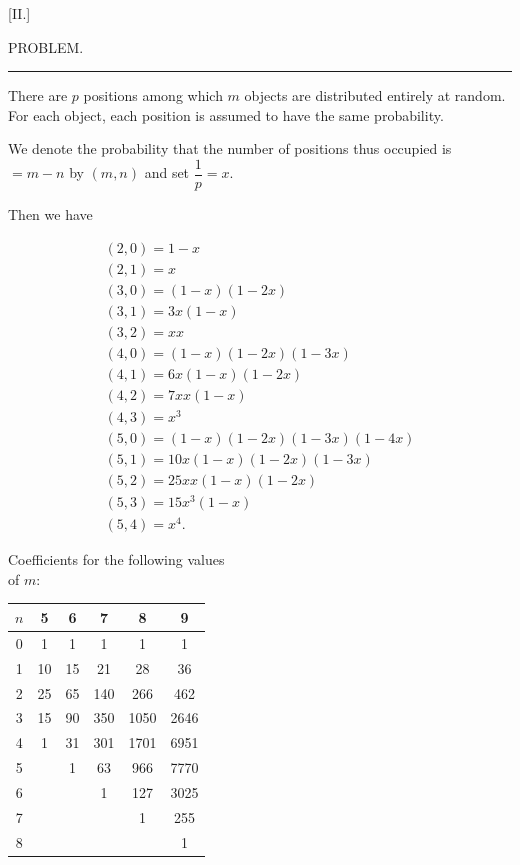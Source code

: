 \clearpage
{}
\begin{center}
[II.]
\end{center}

\begin{center}
PROBLEM.
\end{center}

\bigskip
\hrule
\bigskip

There are $p$ positions among which $m$ objects are distributed
entirely at random. For each object, each position is assumed to have
the same probability.

We denote the probability that the number of positions thus occupied is $= m-n$
by $(m,n)$ and set $\dfrac{1}{p}=x$.


Then we have

\[
\begin{array}{l}
(2,0) = 1-x \\
(2,1) = x \\
(3,0) = (1-x)(1-2x) \\
(3,1) = 3x(1-x) \\
(3,2) = xx \\
(4,0) = (1-x)(1-2x)(1-3x) \\
(4,1) = 6x(1-x)(1-2x) \\
(4,2) = 7xx(1-x) \\
(4,3) = x^3 \\
(5,0) = (1-x)(1-2x)(1-3x)(1-4x) \\
(5,1) = 10x(1-x)(1-2x)(1-3x) \\
(5,2) = 25xx(1-x)(1-2x) \\
(5,3) = 15x^3(1-x) \\
(5,4) = x^4.
\end{array}
\]
\begin{center}
Coefficients for the following values\\
of $m$:

\smallskip
\begin{tabular}{c||c|c|c|c|c}
$n$ & 5 & 6 & 7 & 8 & 9 \\ \hline\hline
0 & 1 & 1 & 1 & 1 & 1 \\ \hline
1 & 10 & 15 & 21 & 28 & 36 \\ \hline
2 & 25 & 65 & 140 & 266 & 462 \\ \hline
3 & 15 & 90 & 350 & 1050 & 2646 \\ \hline
4 & 1 & 31 & 301 & 1701 & 6951 \\ \hline
5 & & 1 & 63 & 966 & 7770 \\ \hline
6 & & & 1 & 127 & 3025 \\ \hline
7 & & & & 1 & 255 \\ \hline
8 & & & & & 1 \\
\end{tabular}

\end{center}
